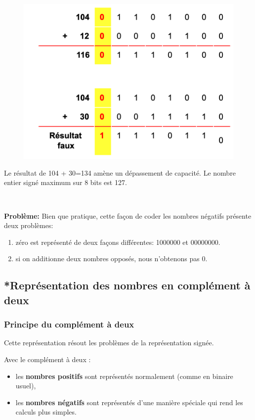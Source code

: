 \documentclass[11pt, a4paper]{book}
\begin{document}
\begin{figure}[h]
\begin{center}
\includegraphics[scale=.5]{images/Operationsigne}
\end{center}
\end{figure}

Le résultat de 104 + 30=134 amène un dépassement de capacité. Le nombre entier signé maximum sur 8 bits est 127.


\ 

{\bf Problème:} Bien que pratique, cette façon de coder les nombres négatifs présente deux problèmes:
\begin{enumerate}
\item zéro est représenté de deux façons différentes: 1000000 et 00000000.
\item si on additionne deux nombres opposés, nous n'obtenons pas 0. 
\end{enumerate}

\subsection{*Représentation des nombres en complément à deux}
\subsubsection{Principe du complément à deux}
Cette représentation résout les problèmes de la représentation signée.

Avec le complément à deux :  
\begin{itemize}
  \item les \textbf{nombres positifs} sont représentés normalement (comme en binaire usuel),  
  \item les \textbf{nombres négatifs} sont représentés d’une manière spéciale qui rend les calculs plus simples.  
\end{itemize}
\end{document}
